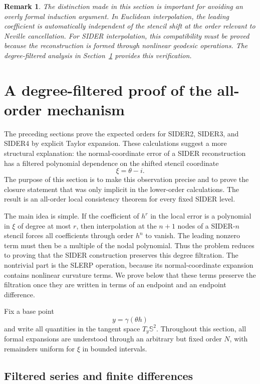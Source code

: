 \documentclass[a4paper,11pt]{article}
\newcommand{\bS}{\mathbb{S}}
\newtheorem{remark}{Remark}
\numberwithin{equation}{section}
\begin{document}
\begin{remark}
The distinction made in this section is important for avoiding an overly
formal induction argument.  In Euclidean interpolation, the leading coefficient
is automatically independent of the stencil shift at the order relevant to
Neville cancellation.  For SIDER interpolation, this compatibility must be
proved because the reconstruction is formed through nonlinear geodesic
operations.  The degree-filtered analysis in
Section~\ref{sec:degree_filter} provides this verification.
\end{remark}

\section{A degree-filtered proof of the all-order mechanism}
\label{sec:degree_filter}

The preceding sections prove the expected orders for SIDER2, SIDER3, and
SIDER4 by explicit Taylor expansion.  These calculations suggest a more
structural explanation: the normal-coordinate error of a SIDER reconstruction
has a filtered polynomial dependence on the shifted stencil coordinate
\[
        \xi=\theta-i .
\]
The purpose of this section is to make this observation precise and to prove
the closure statement that was only implicit in the lower-order calculations.
The result is an all-order local consistency theorem for every fixed SIDER
level.

The main idea is simple.  If the coefficient of \(h^r\) in the local error is
a polynomial in \(\xi\) of degree at most \(r\), then interpolation at the
\(n+1\) nodes of a SIDER-\(n\) stencil forces all coefficients through order
\(h^n\) to vanish.  The leading nonzero term must then be a multiple of the
nodal polynomial.  Thus the problem reduces to proving that the SIDER
construction preserves this degree filtration.  The nontrivial part is the
SLERP operation, because its normal-coordinate expansion contains nonlinear
curvature terms.  We prove below that these terms preserve the filtration once
they are written in terms of an endpoint and an endpoint difference.

Fix a base point
\[
        y=\gamma(\theta h)
\]
and write all quantities in the tangent space \(T_y\bS^2\).  Throughout this
section, all formal expansions are understood through an arbitrary but fixed
order \(N\), with remainders uniform for \(\xi\) in bounded intervals.

\subsection{Filtered series and finite differences}
\end{document}
